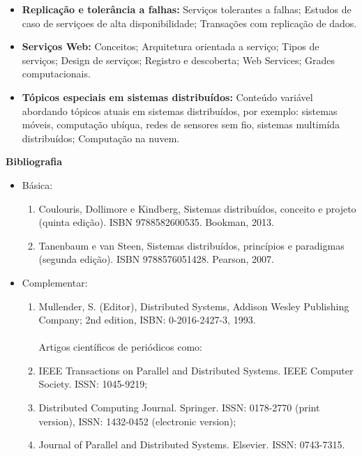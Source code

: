 \begin{itemize}
\item \textbf{Replicação e tolerância a falhas:} Servi\c{c}os tolerantes a falhas; Estudos de caso de servi\c{c}oes de alta disponibilidade; Transa\c{c}\~oes com replica\c{c}\~ao de dados.

\item \textbf{Serviços Web:} Conceitos; Arquitetura orientada a servi\c{c}o; Tipos de servi\c{c}os; Design de servi\c{c}os; Registro e descoberta; Web Services; Grades computacionais.

\item \textbf{T\'opicos especiais em sistemas distribu\'idos:} Conte\'udo vari\'avel abordando t\'opicos atuais em sistemas distribu\'idos, por exemplo: sistemas m\'oveis, computa\c{c}\~ao ub\'iqua, redes de sensores sem fio, sistemas multim\'ida distribu\'idos; Computa\c{c}\~ao na nuvem.

\end{itemize}







\begin{snugshade}\begin{center}\textbf{
    Bibliografia
}\end{center}\end{snugshade}

\begin{itemize} 
  \item Básica:
	\begin{enumerate}
		\item Coulouris, Dollimore e Kindberg, Sistemas distribuídos, conceito e projeto (quinta edição). ISBN 9788582600535. Bookman, 2013.
		\item Tanenbaum e van Steen, Sistemas distribuídos, princípios e paradigmas (segunda edição). ISBN 9788576051428. Pearson, 2007.
	\end{enumerate}
  \item Complementar:
	\begin{enumerate} 
		\item Mullender, S. (Editor), Distributed Systems, Addison Wesley Publishing Company; 2nd edition, ISBN: 0-2016-2427-3, 1993.\\
        \\
	Artigos cient\'ificos de peri\'odicos como: 
		\item IEEE Transactions on Parallel and Distributed Systems. IEEE Computer Society. ISSN: 1045-9219;
		\item Distributed Computing Journal. Springer. ISSN: 0178-2770 (print version), ISSN: 1432-0452 (electronic version);
		\item Journal of Parallel and Distributed Systems. Elsevier. ISSN: 0743-7315.
	\end{enumerate}
\end{itemize}
